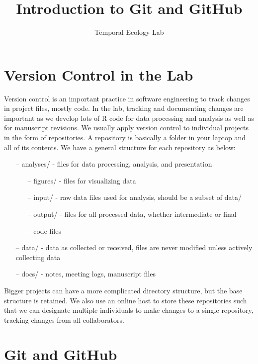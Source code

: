 \documentclass[11pt]{article}
\begin{document}


\title{Introduction to Git and GitHub}
\author{Temporal Ecology Lab}
\maketitle

\section{Version Control in the Lab}

Version control is an important practice in software engineering to track changes in project files, mostly code. In the lab, tracking and documenting changes are important as we develop lots of R code for data processing and analysis as well as for manuscript revisions. We usually apply version control to individual projects in the form of repositories. A repository is basically a folder in your laptop and all of its contents. We have a general structure for each repository as below:

\begin{itemize}
  \item[--] analyses/ - files for data processing, analysis, and presentation
  \begin{itemize}
    \item[--] figures/ - files for visualizing data
    \item[--] input/ - raw data files used for analysis, should be a subset of data/
    \item[--] output/ - files for all processed data, whether intermediate or final
    \item[--] code files

  \end{itemize}
  \item[--] data/ - data as collected or received, files are never modified unless actively collecting data
  \item[--] docs/ - notes, meeting logs, manuscript files 
\end{itemize}

Bigger projects can have a more complicated directory structure, but the base structure is retained. We also use an online host to store these repositories such that we can designate multiple individuals to make changes to a single repository, tracking changes from all collaborators.

\section{Git and GitHub}
\end{document}
